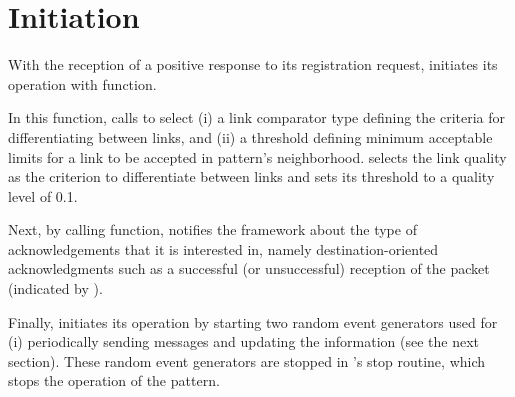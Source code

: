 \section {Initiation} \label{sec:Initiation}

With the reception of a positive response to its registration request,  initiates its operation with  function.

In this function,  calls  to select
(i) a link comparator type defining the criteria for differentiating between links, and 
(ii) a threshold defining minimum acceptable limits for a link to be accepted in pattern's neighborhood. 
 selects the link quality as the criterion to differentiate between links and sets its threshold to a quality level of 0.1. 

Next, by calling  function,
 notifies the framework about the type of acknowledgements that it is interested in, 
namely destination-oriented acknowledgments 
such as a successful (or unsuccessful) reception of the packet (indicated by ).


Finally,  initiates its operation by starting two random event generators used for (i) periodically sending messages and updating the
information (see the next section). 
These random event generators are stopped in 's stop routine, which stops the operation of the pattern. 


